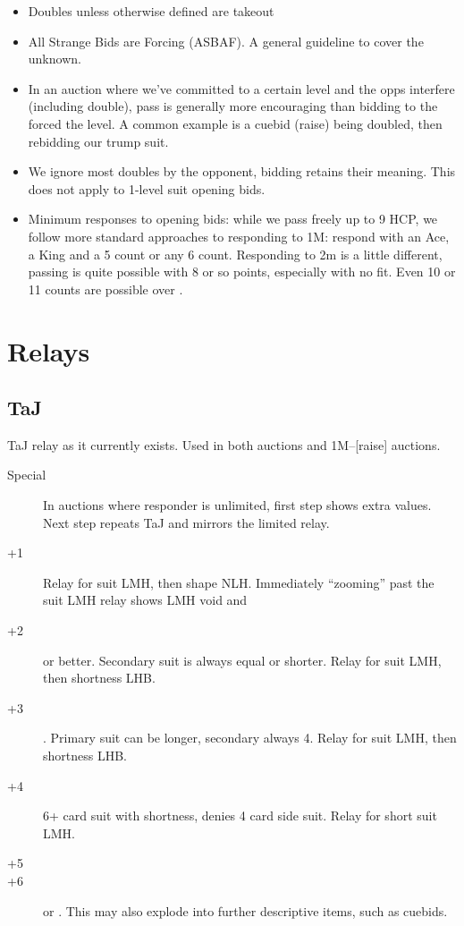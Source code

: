\documentclass[tom-ari]{subfile}
\begin{document}
\begin{itemize}
	\item Doubles unless otherwise defined are takeout
	\item All Strange Bids are Forcing (ASBAF).  A general guideline to cover the unknown.
	\item In an auction where we've committed to a certain level and the opps interfere (including double), pass is generally more encouraging than bidding to the forced the level.  A common example is a cuebid (raise) being doubled, then rebidding our trump suit.
	\item We ignore most doubles by the opponent, bidding retains their meaning.  This does not apply to 1-level suit opening bids.
	\item Minimum responses to opening bids: while we pass  freely up to 9 HCP, we follow more standard approaches to responding to 1M: respond with an Ace, a King and a 5 count or any 6 count.  Responding to 2m is a little different, passing is quite possible with 8 or so points, especially with no fit.  Even 10 or 11 counts are possible over .
\end{itemize}	

\section{Relays}

\subsection{TaJ}
TaJ relay as it currently exists.  Used in both  auctions and 1M--[raise] auctions.

\begin{description}
	\item[Special] In auctions where responder is unlimited, first step shows extra values.  Next step repeats TaJ and mirrors the limited relay.
	\item[+1]  Relay for \second suit LMH, then shape NLH.  Immediately ``zooming'' past the \second suit LMH relay shows LMH void and 
	\item[+2]  or better.  Secondary suit is always equal or shorter.  Relay for \second suit LMH, then shortness LHB.
	\item[+3] .  Primary suit can be longer, secondary always 4.  Relay for \second suit LMH, then shortness LHB.
	\item[+4] 6+ card suit with shortness, denies 4 card side suit.  Relay for short suit LMH.
	\item[+5] 
	\item[+6]  or .  This may also explode into further descriptive items, such as cuebids.   
\end{description}
\end{document}
